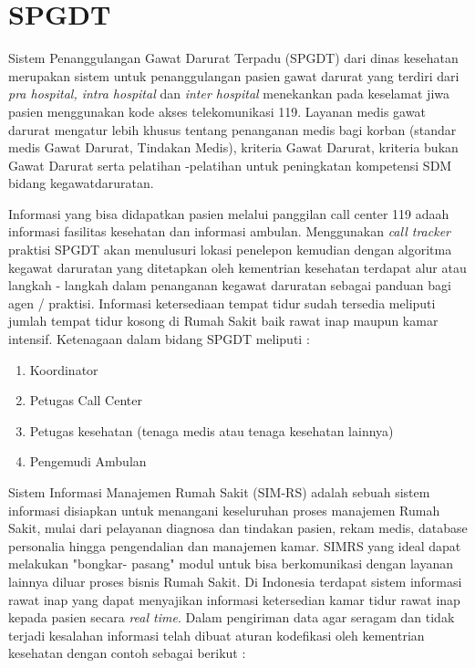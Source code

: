 \section {SPGDT}
Sistem Penanggulangan Gawat Darurat Terpadu (SPGDT) dari dinas kesehatan merupakan sistem untuk penanggulangan pasien gawat darurat yang terdiri dari \textit{pra hospital, intra hospital} dan \textit{inter hospital} menekankan pada keselamat jiwa pasien menggunakan kode akses telekomunikasi 119\cite{kemenkes}. Layanan medis gawat darurat mengatur lebih khusus tentang penanganan medis bagi korban (standar medis Gawat Darurat, Tindakan Medis), kriteria Gawat Darurat, kriteria bukan Gawat Darurat serta pelatihan -pelatihan untuk peningkatan kompetensi SDM bidang kegawatdaruratan. \par
Informasi yang bisa didapatkan pasien melalui panggilan call center 119 adaah informasi fasilitas kesehatan dan informasi ambulan. Menggunakan \textit{call tracker} praktisi SPGDT akan menulusuri lokasi penelepon kemudian dengan algoritma kegawat daruratan yang ditetapkan oleh kementrian kesehatan terdapat alur atau langkah - langkah dalam penanganan kegawat daruratan sebagai panduan bagi agen / praktisi. Informasi ketersediaan tempat tidur sudah tersedia meliputi jumlah tempat tidur kosong di Rumah Sakit baik rawat inap maupun kamar intensif. Ketenagaan dalam bidang SPGDT meliputi :
\begin{enumerate}
	\item Koordinator
	\item Petugas Call Center 
	\item Petugas kesehatan (tenaga medis atau tenaga kesehatan lainnya)
	\item Pengemudi Ambulan
\end{enumerate}
\par
Sistem Informasi Manajemen Rumah Sakit (SIM-RS) adalah sebuah sistem informasi disiapkan untuk menangani keseluruhan proses manajemen Rumah Sakit, mulai dari pelayanan diagnosa dan tindakan pasien, rekam medis, database personalia hingga pengendalian dan manajemen kamar. SIMRS yang ideal dapat melakukan "bongkar- pasang" modul untuk bisa berkomunikasi dengan layanan lainnya diluar proses bisnis Rumah Sakit. Di Indonesia terdapat sistem informasi rawat inap yang dapat menyajikan informasi ketersedian kamar tidur rawat inap kepada pasien secara \textit{real time}. Dalam pengiriman data agar seragam dan tidak terjadi kesalahan informasi telah dibuat aturan kodefikasi oleh kementrian kesehatan dengan contoh sebagai berikut :
